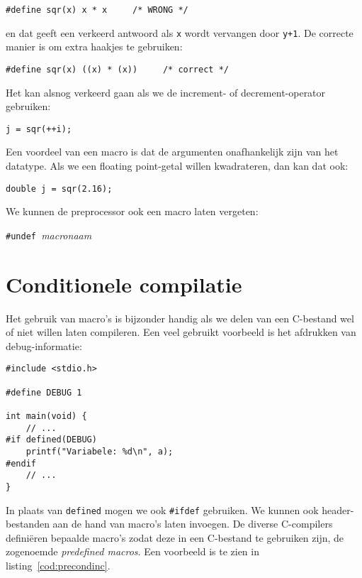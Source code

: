 \hspace*{1em}\texttt{\#define sqr(x) x * x \ \ \ \ /* WRONG */}

en dat geeft een verkeerd antwoord als \texttt{x} wordt vervangen door \texttt{y+1}. De correcte manier is om extra haakjes te gebruiken:

\hspace*{1em}\texttt{\#define sqr(x) ((x) * (x)) \ \ \ \ /* correct */}

Het kan alsnog verkeerd gaan als we de increment- of decrement-operator gebruiken:

\hspace*{1em}\texttt{j = sqr(++i);}

Een voordeel van een macro is dat de argumenten onafhankelijk zijn van het datatype. Als we een floating point-getal willen kwadrateren, dan kan dat ook:

\hspace*{1em}\texttt{double j = sqr(2.16);}

We kunnen de preprocessor ook een macro laten vergeten:

\hspace*{1em}\texttt{\#undef }\textsl{macronaam}


\section{Conditionele compilatie}
Het gebruik van macro's is bijzonder handig als we delen van een C-bestand wel of niet willen laten compileren. Een veel gebruikt voorbeeld is het afdrukken van debug-informatie:

\begin{lstlisting}[caption=Conditionele compilatie.]
#include <stdio.h>

#define DEBUG 1

int main(void) {
    // ...
#if defined(DEBUG)
    printf("Variabele: %d\n", a);
#endif
    // ...
}
\end{lstlisting}

In plaats van \texttt{defined} mogen we ook \texttt{\#ifdef} gebruiken. We kunnen ook header-bestanden aan de hand van macro's laten invoegen. De diverse C-compilers definiëren bepaalde macro's zodat deze in een C-bestand te gebruiken zijn, de zogenoemde \textsl{predefined macros}. Een voorbeeld is te zien in listing~\ref{cod:precondinc}.

